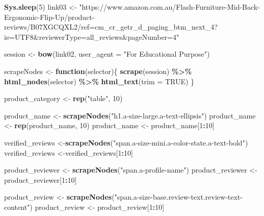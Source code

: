 \documentclass[
]{article}
\newenvironment{Shaded}{\begin{snugshade}}{\end{snugshade}}
\newcommand{\AttributeTok}[1]{\textcolor[rgb]{0.13,0.29,0.53}{#1}}
\newcommand{\ConstantTok}[1]{\textcolor[rgb]{0.56,0.35,0.01}{#1}}
\newcommand{\ControlFlowTok}[1]{\textcolor[rgb]{0.13,0.29,0.53}{\textbf{#1}}}
\newcommand{\DecValTok}[1]{\textcolor[rgb]{0.00,0.00,0.81}{#1}}
\newcommand{\FunctionTok}[1]{\textcolor[rgb]{0.13,0.29,0.53}{\textbf{#1}}}
\newcommand{\NormalTok}[1]{#1}
\newcommand{\OtherTok}[1]{\textcolor[rgb]{0.56,0.35,0.01}{#1}}
\newcommand{\SpecialCharTok}[1]{\textcolor[rgb]{0.81,0.36,0.00}{\textbf{#1}}}
\newcommand{\StringTok}[1]{\textcolor[rgb]{0.31,0.60,0.02}{#1}}
\begin{document}
\begin{Shaded}
\begin{Highlighting}[]
   \FunctionTok{Sys.sleep}\NormalTok{(}\DecValTok{5}\NormalTok{)}
\NormalTok{link03 }\OtherTok{\textless{}{-}} \StringTok{"https://www.amazon.com.au/Flash{-}Furniture{-}Mid{-}Back{-}Ergonomic{-}Flip{-}Up/product{-}reviews/B07XGCQXL2/ref=cm\_cr\_getr\_d\_paging\_btm\_next\_4?ie=UTF8\&reviewerType=all\_reviews\&pageNumber=4"}


\NormalTok{  session }\OtherTok{\textless{}{-}} \FunctionTok{bow}\NormalTok{(link02,}
               \AttributeTok{user\_agent =} \StringTok{"For Educational Purpose"}\NormalTok{)}

\NormalTok{  scrapeNodes }\OtherTok{\textless{}{-}} \ControlFlowTok{function}\NormalTok{(selector)\{}
    \FunctionTok{scrape}\NormalTok{(session) }\SpecialCharTok{\%\textgreater{}\%}
      \FunctionTok{html\_nodes}\NormalTok{(selector) }\SpecialCharTok{\%\textgreater{}\%}
      \FunctionTok{html\_text}\NormalTok{(}\AttributeTok{trim =} \ConstantTok{TRUE}\NormalTok{)}
\NormalTok{  \}}

\NormalTok{  product\_category }\OtherTok{\textless{}{-}} \FunctionTok{rep}\NormalTok{(}\StringTok{"table"}\NormalTok{, }\DecValTok{10}\NormalTok{)}

\NormalTok{  product\_name }\OtherTok{\textless{}{-}} \FunctionTok{scrapeNodes}\NormalTok{(}\StringTok{"h1.a{-}size{-}large.a{-}text{-}ellipsis"}\NormalTok{)}
\NormalTok{  product\_name }\OtherTok{\textless{}{-}} \FunctionTok{rep}\NormalTok{(product\_name, }\DecValTok{10}\NormalTok{)}
\NormalTok{  product\_name }\OtherTok{\textless{}{-}}\NormalTok{ product\_name[}\DecValTok{1}\SpecialCharTok{:}\DecValTok{10}\NormalTok{]}
  
\NormalTok{  verified\_reviews }\OtherTok{\textless{}{-}}\FunctionTok{scrapeNodes}\NormalTok{(}\StringTok{"span.a{-}size{-}mini.a{-}color{-}state.a{-}text{-}bold"}\NormalTok{)}
\NormalTok{  verified\_reviews }\OtherTok{\textless{}{-}}\NormalTok{verified\_reviews[}\DecValTok{1}\SpecialCharTok{:}\DecValTok{10}\NormalTok{]}
  
\NormalTok{  product\_reviewer }\OtherTok{\textless{}{-}} \FunctionTok{scrapeNodes}\NormalTok{(}\StringTok{"span.a{-}profile{-}name"}\NormalTok{)}
\NormalTok{  product\_reviewer }\OtherTok{\textless{}{-}}\NormalTok{ product\_reviewer[}\DecValTok{1}\SpecialCharTok{:}\DecValTok{10}\NormalTok{]}
  
\NormalTok{  product\_review }\OtherTok{\textless{}{-}} \FunctionTok{scrapeNodes}\NormalTok{(}\StringTok{"span.a{-}size{-}base.review{-}text.review{-}text{-}content"}\NormalTok{)}
\NormalTok{  product\_review }\OtherTok{\textless{}{-}}\NormalTok{ product\_review[}\DecValTok{1}\SpecialCharTok{:}\DecValTok{10}\NormalTok{]}
  

\end{Highlighting}
\end{Shaded}
\end{document}
